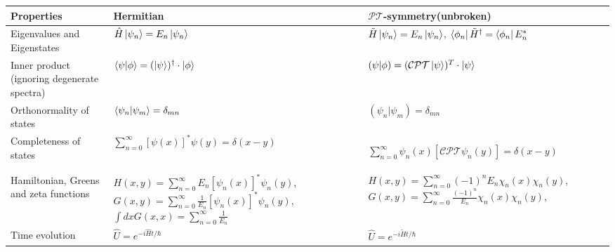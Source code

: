 \documentclass[12pt, a4paper]{report}
\newcommand\PT{\(\mathcal{PT}\)}
\begin{document}
{\renewcommand{\arraystretch}{2}
\noindent\begin{tabularx}{1.1\textwidth} { 
  | >{\raggedright\arraybackslash}X 
  | >{\raggedright\arraybackslash}X 
  | >{\raggedright\arraybackslash}X | }
 \hline
  \textbf{Properties} 
  & \textbf{Hermitian} 
  & \textbf{\PT-symmetry}\newline \small{(unbroken)} \\
   \hline
  Eigenvalues \newline and Eigenstates
  & $\hat{H}\ket{\psi_n} = E_n \ket{\psi_n}$ 
  & $\tilde{H}\ket{\psi_n} = E_n \ket{\psi_n}$, $\bra{\phi_n}\tilde{H}^{\dagger} = \bra{\phi_n}E_{n}^{*}$\\
  \hline
  Inner product \newline \tiny{(ignoring degenerate spectra)}
  & $\braket{\psi|\phi} = (\ket{\psi})^{\dagger} \cdot \ket{\phi}$
  & $\left(\psi|\phi\right) = (\mathcal{CPT}\ket{\psi})^{T} \cdot \ket{\psi}$ \\
  \hline
  Orthonormality of states 
  & $\braket{\psi_n|\psi_m} = \delta_{mn}$ 
  & $\left(\psi_n|\psi_m\right) = \delta_{mn}$\\
  \hline
  Completeness of states 
  & $\sum\limits_{n = 0}^{\infty} [\psi(x)]^{*} \psi(y) = \delta(x-y)$
  & \begin{small}{$\sum\limits_{n = 0}^{\infty} \psi_n(x) [\mathcal{CPT}\psi_n(y)] = \delta(x-y)$}\end{small}\\
  \hline
  Hamiltonian, Greens \newline and zeta functions 
  & \small{$H(x,y) = \sum\limits_{n = 0}^{\infty} E_n [\psi_n(x)]^{*}\psi_n(y)$, 
  \newline $G(x,y) = \sum\limits_{n = 0}^{\infty} \frac{1}{E_n} [\psi_n(x)]^{*}\psi_n(y)$,
  \newline $\int dx G(x,x) =  \sum\limits_{n = 0}^{\infty} \frac{1}{E_n}$}
  & \small{$H(x,y) = \sum\limits_{n = 0}^{\infty}(-1)^{n} E_n \chi_n(x)\chi_n(y)$, \newline $G(x,y) = \sum\limits_{n = 0}^{\infty} \frac{(-1)^n}{E_n}\chi_n(x)\chi_n(y)$, \newline }\\

  \hline
  Time evolution
  & $\hat{U} = e^{-i\hat{H}t/\hbar}$
  & $\hat{U} = e^{-i\tilde{H}t/\hbar}$\\
  \hline
\end{tabularx}
}
\end{document}
